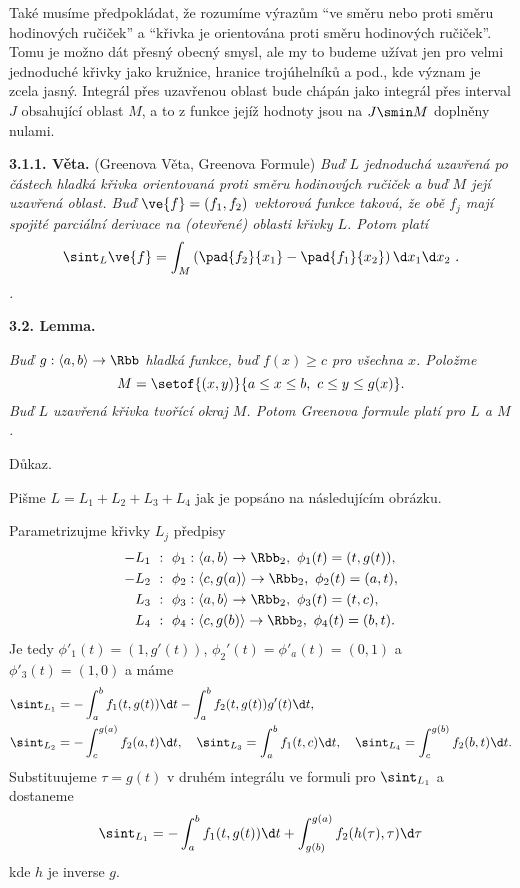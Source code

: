 \documentclass[12pt]{article}
\begin{document}
Také musíme předpokládat, že rozumíme výrazům ``ve směru nebo proti směru hodinových ručiček'' a ``křivka je orientována proti směru hodinových ručiček''. Tomu je možno dát přesný obecný smysl, ale my to budeme užívat jen pro velmi jednoduché křivky jako kružnice, hranice trojúhelníků a pod., kde význam je zcela jasný. Integrál
přes uzavřenou oblast bude chápán jako integrál přes
 interval $J$ obsahující oblast $M$, a to z funkce jejíž hodnoty jsou na $J\smin M$ doplněny nulami.

\smallskip
 
{\bf 3.1.1. Věta.} (Greenova Věta, Greenova Formule) {\em Buď $L$ jednoduchá uzavřená po částech hladká křivka
orientovaná proti směru hodinových ručiček a buď
 $M$ její uzavřená oblast. Buď  $\ve{f}=(f_1, f_2)$ vektorová funkce taková, že obě $f_j$ mají spojité parciální derivace na
 (otevřené) oblasti křivky $L$. Potom platí
$$
\sint_L\ve{f}=\int_M\left(\pad{f_2}{x_1}-\pad{f_1}{x_2}\right)\d x_1\d x_2 \ .
$$.}

\bigskip

{\bf 3.2. Lemma.} {\em Buď $g:\langle a,b\rangle\to\Rbb$ hladká funkce, buď $f(x)\geq c$ pro všechna $x$. Položme
$$
M=\setof{(x,y)}{a\leq x\leq b, \ c\leq y\leq g(x)}.
$$
Buď $L$ uzavřená křivka tvořící okraj $M$. Potom Greenova formule platí pro $L$ a $M$.


Důkaz.} Pišme  $L=L_1+L_2+L_3+L_4$ jak je popsáno na následujícím obrázku.


\vskip1mm

\centerline{
}
 \vskip1mm
 
 Parametrizujme křivky $L_j$ předpisy
 $$
 \begin{aligned}
 -&L_1\ : \ \phi_1:\langle a,b\rangle\to\Rbb_2, \ \phi_1(t)=(t,g(t)),\\
 -&L_2\ : \ \phi_2:\langle c,g(a)\rangle\to\Rbb_2, \ \phi_2(t)=(a,t),\\
 &L_3\ : \ \phi_3:\langle a,b\rangle\to\Rbb_2, \ \phi_3(t)=(t,c),\\
 &L_4\ : \ \phi_4:\langle c,g(b)\rangle\to\Rbb_2, \ \phi_4(t)=(b,t).
 \end{aligned}
 $$
 Je tedy $\phi'_1(t)=(1,g'(t))$, $\phi_2'(t)=\phi'_a(t)=(0,1)$ a $\phi'_3(t)=(1,0)$ a máme
 $$
 \begin{aligned}
 &\sint_{L_1}=-\int_a^bf_1(t,g(t))\d t-\int_a^bf_2(t,g(t))g'(t)\d t,\\
 &\sint_{L_2}= -\int_c^{g(a)}f_2(a,t)\d t, \quad \sint_{L_3}=\int_a^bf_1(t,c)\d t,\quad \sint_{L_4}=\int_c^{g(b)}f_2(b,t)\d t.
 \end{aligned}
 $$
Substituujeme $\tau=g(t)$ v druhém integrálu ve formuli pro
 $\sint_{L_1}$ a dostaneme
$$
 \sint_{L_1}=-\int_a^bf_1(t,g(t))\d t+\int_{g(b)}^{g(a)}f_2(h(\tau),\tau)\d \tau
 $$
 kde $h$ je inverse $g$. 
\end{document}
